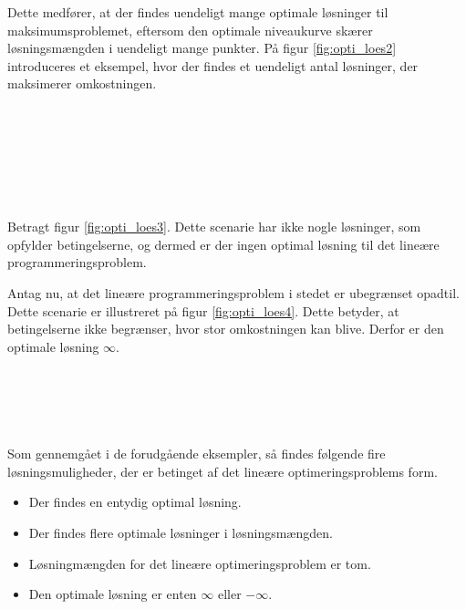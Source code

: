 Dette medfører, at der findes uendeligt mange optimale løsninger til maksimumsproblemet, eftersom den optimale niveaukurve skærer løsningsmængden i uendeligt mange punkter.
På figur \ref{fig:opti_loes2} introduceres et eksempel, hvor der findes et uendeligt antal løsninger, der
maksimerer omkostningen. 
%
\newline
\phantom{Hej}
\\\\
\phantom{Hej}
\\\\
\phantom{Hej}
\\\\
\phantom{Hej}
\\\\
%

%
\noindent
%
Betragt figur \ref{fig:opti_loes3}.
Dette scenarie har ikke nogle løsninger, som opfylder betingelserne, og dermed er der ingen optimal løsning til det lineære programmeringsproblem. 
%

%
\noindent
%
Antag nu, at det lineære programmeringsproblem i stedet er ubegrænset opadtil.
Dette scenarie er illustreret på figur \ref{fig:opti_loes4}.
%
Dette betyder, at betingelserne ikke begrænser, hvor stor
omkostningen kan blive. 
Derfor er den optimale løsning $\infty$.
%
\phantom{Hej}
\\\\
\phantom{Hej}
\\\\
\phantom{Hej}
\\\\
%

%
\noindent
%
Som gennemgået i de forudgående eksempler, så findes følgende fire løsningsmuligheder, der er betinget af det lineære optimeringsproblems form.
%
\begin{itemize}
\item Der findes en entydig optimal løsning.
\item Der findes flere optimale løsninger i løsningsmængden.
\item Løsningmængden for det lineære optimeringsproblem er tom. 
\item Den optimale løsning er enten $\infty$ eller $-\infty$.
\end{itemize}
%